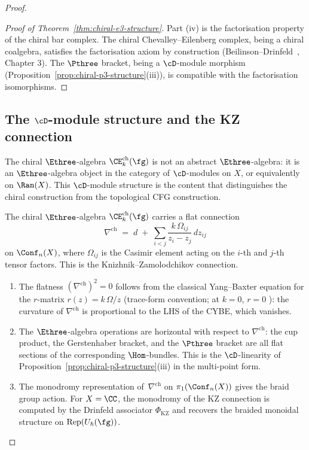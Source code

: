 \begin{proof}
\begin{proof}[Proof of Theorem~\ref{thm:chiral-e3-structure}]
Part (iv) is the factorisation property of the chiral
bar complex. The chiral Chevalley--Eilenberg complex, being
a chiral coalgebra, satisfies the factorisation axiom
by construction (Beilinson--Drinfeld~\cite{BD04}, Chapter 3).
The $\Pthree$ bracket, being a $\cD$-module morphism
(Proposition~\ref{prop:chiral-p3-structure}(iii)), is
compatible with the factorisation isomorphisms.
\end{proof}


\subsection{The $\cD$-module structure and the KZ connection}
\label{subsec:chiral-e3-dmod}

The chiral $\Ethree$-algebra
$\CE^{\mathrm{ch}}_k(\fg)$ is not an abstract
$\Ethree$-algebra: it is an $\Ethree$-algebra object
in the category of $\cD$-modules on $X$, or equivalently
on $\Ran(X)$. This $\cD$-module structure is the content
that distinguishes the chiral construction from the
topological CFG construction.

\begin{proposition}
\label{prop:chiral-e3-dmod}
The chiral $\Ethree$-algebra
$\CE^{\mathrm{ch}}_k(\fg)$ carries a flat connection
\begin{equation}\label{eq:chiral-e3-connection}
  \nabla^{\mathrm{ch}}
  \;=\;
  d \;+\; \sum_{i < j}
  \frac{k\,\Omega_{ij}}{z_i - z_j}\,dz_{ij}
\end{equation}
on $\Conf_n(X)$, where $\Omega_{ij}$ is the Casimir element
acting on the $i$-th and $j$-th tensor factors. This is the
Knizhnik--Zamolodchikov connection.
\begin{enumerate}[label=\textup{(\roman*)}]
\item The flatness
  $(\nabla^{\mathrm{ch}})^2 = 0$ follows from the
  classical Yang--Baxter equation for the $r$-matrix
  $r(z) = k\,\Omega/z$
  \textup{(}trace-form convention; at $k = 0$, $r = 0$%
  \textup{)}: the curvature of $\nabla^{\mathrm{ch}}$
  is proportional to the LHS of the CYBE, which vanishes.
\item The $\Ethree$-algebra operations are horizontal
  with respect to $\nabla^{\mathrm{ch}}$: the cup product,
  the Gerstenhaber bracket, and the $\Pthree$ bracket are
  all flat sections of the corresponding $\Hom$-bundles.
  This is the $\cD$-linearity of
  Proposition~\textup{\ref{prop:chiral-p3-structure}(iii)}
  in the multi-point form.
\item The monodromy representation of~$\nabla^{\mathrm{ch}}$
  on $\pi_1(\Conf_n(X))$ gives the braid group action.
  For $X = \CC$, the monodromy of the KZ connection
  is computed by the Drinfeld associator
  $\Phi_{\mathrm{KZ}}$
  and recovers the braided monoidal structure on
  $\mathrm{Rep}(U_\hbar(\fg))$.
\end{enumerate}
\end{proposition}


\end{proof}
